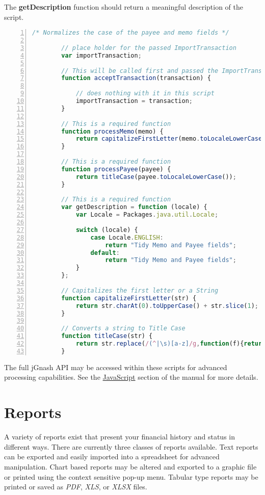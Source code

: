 \documentclass[letterpaper,12pt]{book}
\begin{document}
    The \textbf{getDescription} function should return a meaningful description of the script.
    \\ %
    \begin{lstlisting}[caption={Example Import Script},language=JavaScript,numbers=left]
        /* Normalizes the case of the payee and memo fields */

        // place holder for the passed ImportTransaction
        var importTransaction;

        // This will be called first and passed the ImportTransaction
        function acceptTransaction(transaction) {

            // does nothing with it in this script
            importTransaction = transaction;
        }

        // This is a required function
        function processMemo(memo) {
            return capitalizeFirstLetter(memo.toLocaleLowerCase());
        }

        // This is a required function
        function processPayee(payee) {
            return titleCase(payee.toLocaleLowerCase());
        }

        // This is a required function
        var getDescription = function (locale) {
            var Locale = Packages.java.util.Locale;
    
            switch (locale) {
                case Locale.ENGLISH:
                    return "Tidy Memo and Payee fields";
                default:
                    return "Tidy Memo and Payee fields";
            }
        };

        // Capitalizes the first letter or a String
        function capitalizeFirstLetter(str) {
            return str.charAt(0).toUpperCase() + str.slice(1);
        }

        // Converts a string to Title Case
        function titleCase(str) {
            return str.replace(/(^|\s)[a-z]/g,function(f){return f.toUpperCase();});
        }
    \end{lstlisting}

    The full jGnash API may be accessed within these scripts for advanced processing capabilities.
    See the \hyperref[sec:javascript]{JavaScript} section of the manual for more details.


    \chapter{Reports}
    A variety of reports exist that present your financial history and status in different ways.
    There are currently three classes of reports available.
    Text reports can be exported and easily imported into a spreadsheet for advanced manipulation.
    Chart based reports may be altered and exported to a graphic file or printed using the context sensitive pop-up menu.
    Tabular type reports may be printed or saved as \textit{PDF}, \textit{XLS}, or \textit{XLSX} files.
\end{document}

